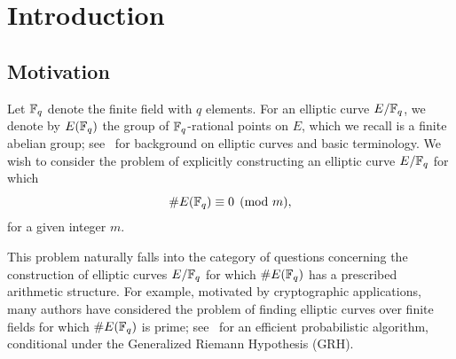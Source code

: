 \documentclass[12pt]{amsart}
\begin{document}
\author{Andrew V. Sutherland}  
\address{Department of Mathematics, Massachusetts Institute of Technology, Cambridge, Massachusetts 02139, USA} 



\begin{abstract} 
Assuming the Generalized Riemann Hypothesis, 
we design a deterministic algorithm
that, given a prime $p$ and positive integer 
$m=o(p^{1/2} (\log p)^{-4})$, 
outputs an  elliptic curve $E$ over the finite field $\F_p$ for which the
cardinality of $E(\F_p)$ is divisible by $m$.
The running time of the algorithm is $mp^{1/2+o(1)}$, and this leads
to more efficient constructions of rational
functions over $\F_p$ whose image is small relative to $p$.
We also give an unconditional version of the algorithm that works
for almost all primes $p$, and give a probabilistic algorithm with
subexponential time complexity.
\end{abstract}

\maketitle

\section{Introduction}  


\subsection{Motivation} 

Let $\mathbb{F}_q$ denote the finite field with $q$ elements.
For an elliptic curve $E/\mathbb{F}_q$, we denote by $E(\mathbb{F}_q)$ the group of $\mathbb{F}_q$-rational points on $E$, which we recall is a finite abelian group; see~\cite{ACDFLNV,Gal,Silv} for background on elliptic curves and basic terminology. 
We wish to consider the problem of explicitly constructing
an elliptic curve $E/\mathbb{F}_q$ for which 
$$
\#E(\mathbb{F}_q) \equiv 0 \pmod m,
$$
for a given integer $m$. 

This problem naturally falls into the category of questions concerning the construction of
elliptic curves $E/\mathbb{F}_q$ for which $\#E(\mathbb{F}_q)$ has a prescribed arithmetic structure.
For example, motivated by cryptographic applications, many authors
have considered the problem of finding elliptic curves over finite fields for
which  $\#E(\mathbb{F}_q)$ is prime; 
see~\cite{ShpSuth} for an efficient probabilistic algorithm, conditional 
under the  Generalized Riemann Hypothesis (GRH).
\end{document}

